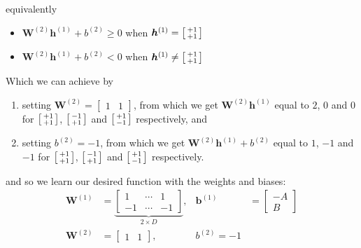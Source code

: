 \documentclass[11pt]{article}
\begin{document}
equivalently
\begin{itemize}
\item $\bm{W}^{(2)} \bm{h}^{(1)} + b^{(2)} \geq 0$ when $\bm{h}^{(1)} = \begin{bsmallmatrix}+1 \\ +1 \end{bsmallmatrix}$
\item $\bm{W}^{(2)} \bm{h}^{(1)} + b^{(2)} < 0$ when $\bm{h}^{(1)} \neq \begin{bsmallmatrix} +1 \\ +1 \end{bsmallmatrix}$
\end{itemize}
Which we can achieve by
\begin{enumerate}
\item setting $\bm{W}^{(2)} = \begin{bmatrix}1 & 1\end{bmatrix}$, from which we get $\bm{W}^{(2)} \bm{h}^{(1)}$ equal to $2$, $0$ and $0$ for $\begin{bsmallmatrix} +1 \\ +1 \end{bsmallmatrix}$, $\begin{bsmallmatrix} -1 \\ +1 \end{bsmallmatrix}$ and $\begin{bsmallmatrix} +1 \\ -1 \end{bsmallmatrix}$ respectively, and
\item setting $b^{(2)} = -1$, from which we get $\bm{W}^{(2)} \bm{h}^{(1)} + b^{(2)}$ equal to $1$, $-1$ and $-1$ for $\begin{bsmallmatrix} +1 \\ +1 \end{bsmallmatrix}$, $\begin{bsmallmatrix} -1 \\ +1 \end{bsmallmatrix}$ and $\begin{bsmallmatrix} +1 \\ -1 \end{bsmallmatrix}$ respectively.
\end{enumerate}
and so we learn our desired function with the weights and biases:
\begin{align*}
  \bm{W}^{(1)} &= \underbrace{\begin{bmatrix}
                   1 &\cdots  &1 \\
                   -1 &\cdots &-1
                 \end{bmatrix}}_{2 \times D}, &\bm{b}^{(1)} &= \begin{bmatrix}
                                                  -A \\
                                                  B
                                                 \end{bmatrix} \\
  \bm{W}^{(2)} &= \begin{bmatrix}
                   1 & 1
                 \end{bmatrix}, & b^{(2)} = -1
\end{align*}
\pagebreak
\end{document}
